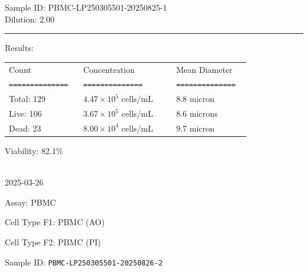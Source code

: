 \documentclass[UTF8,10pt,a4paper,fontset=fandol]{ctexart}
\newcommand{\fieldvalue}[1]{#1}
\newcommand{\handwritten}[1]{#1}
\begin{document}
\noindent Sample ID: PBMC-LP250305501-20250825-1\\
Dilution: 2.00

\vspace{1.2em}

\noindent\rule{\linewidth}{0.4pt}

\vspace{1em}

\noindent Results:

\vspace{1em}

\noindent
\begin{tabular}{@{}p{0.29\linewidth}p{0.35\linewidth}p{0.28\linewidth}@{}}
Count & Concentration & Mean Diameter \\
\texttt{==============} & \texttt{==============} & \texttt{==============} \\
Total: 129 & $4.47\times10^5$ cells/mL & 8.8 micron \\
Live: 106 & $3.67\times10^5$ cells/mL & 8.6 microns \\
Dead: 23 & $8.00\times10^4$ cells/mL & 9.7 micron \\
\end{tabular}

\vspace{1.5em}

\noindent Viability: 82.1\%

\vfill

\begin{flushright}
\handwritten{}\\[0.5em]
\handwritten{2025-03-26}
\end{flushright}

\newpage

Assay: 
\fieldvalue{PBMC}

\medskip

Cell Type F1: 
\fieldvalue{PBMC (AO)}

Cell Type F2: 
\fieldvalue{PBMC (PI)}

\medskip

Sample ID: 
\fieldvalue{\texttt{PBMC-LP250305501-20250826-2}}
\end{document}
